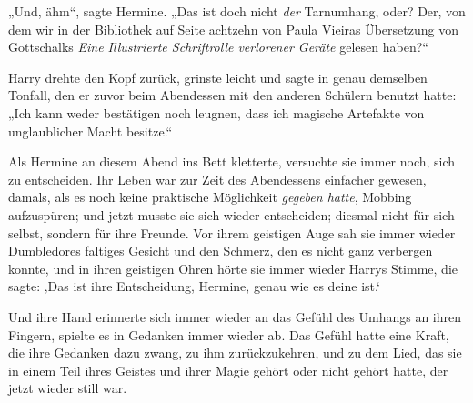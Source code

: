 „Und, ähm“, sagte Hermine.
„Das ist doch nicht \emph{der} Tarnumhang, oder? Der, von dem wir in der Bibliothek auf Seite achtzehn von Paula Vieiras Übersetzung von Gottschalks \emph{Eine Illustrierte Schriftrolle verlorener Geräte} gelesen haben?“

Harry drehte den Kopf zurück, grinste leicht und sagte in genau demselben Tonfall, den er zuvor beim Abendessen mit den anderen Schülern benutzt hatte:
„Ich kann weder bestätigen noch leugnen, dass ich magische Artefakte von unglaublicher Macht besitze.“

\later

Als Hermine an diesem Abend ins Bett kletterte, versuchte sie immer noch, sich zu entscheiden. Ihr Leben war zur Zeit des Abendessens einfacher gewesen, damals, als es noch keine praktische Möglichkeit \emph{gegeben hatte}, Mobbing aufzuspüren; und jetzt musste sie sich wieder entscheiden; diesmal nicht für sich selbst, sondern für ihre Freunde. Vor ihrem geistigen Auge sah sie immer wieder Dumbledores faltiges Gesicht und den Schmerz, den es nicht ganz verbergen konnte, und in ihren geistigen Ohren hörte sie immer wieder Harrys Stimme, die sagte: ‚Das ist ihre Entscheidung, Hermine, genau wie es deine ist.‘

Und ihre Hand erinnerte sich immer wieder an das Gefühl des Umhangs an ihren Fingern, spielte es in Gedanken immer wieder ab. Das Gefühl hatte eine Kraft, die ihre Gedanken dazu zwang, zu ihm zurückzukehren, und zu dem Lied, das sie in einem Teil ihres Geistes und ihrer Magie gehört oder nicht gehört hatte, der jetzt wieder still war.

